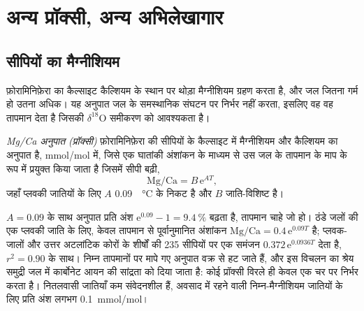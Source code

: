 \section{अन्य प्रॉक्सी, अन्य अभिलेखागार}\label{sec:b2:climate-proxies:others}

\subsection*{सीपियों का मैग्नीशियम}

फ़ोरामिनिफ़ेरा का कैल्साइट कैल्शियम के स्थान पर थोड़ा मैग्नीशियम ग्रहण करता है, और जल जितना गर्म हो
उतना अधिक। यह अनुपात जल के समस्थानिक संघटन पर निर्भर नहीं करता, इसलिए वह
वह तापमान देता है जिसकी $\delta^{18}$O समीकरण को आवश्यकता है।

\begin{definition}[Mg/Ca अनुपात (प्रॉक्सी)]\label{def:b2:climate-proxies:mgca}
\emph{Mg/Ca अनुपात (प्रॉक्सी)} फ़ोरामिनिफ़ेरा की सीपियों के कैल्साइट में
मैग्नीशियम और कैल्शियम का अनुपात है, \unit{mmol/mol} में, जिसे एक घातांकी अंशांकन
के माध्यम से उस जल के तापमान के माप के रूप में प्रयुक्त किया जाता है जिसमें सीपी बढ़ी,
\[
  \text{Mg/Ca} = B\,\mathrm{e}^{A T},
\]
जहाँ प्लवकी जातियों के लिए $A$ \qty{0.09}{\per\celsius} के निकट है और $B$ जाति-विशिष्ट है।
\end{definition}

$A = 0.09$ के साथ अनुपात प्रति अंश $\mathrm{e}^{0.09} - 1 = \qty{9.4}{\percent}$ बढ़ता है,
तापमान चाहे जो हो। ठंडे जलों की एक प्लवकी जाति के लिए, केवल तापमान से पूर्वानुमानित अंशांकन
$\text{Mg/Ca} = 0.4\,\mathrm{e}^{0.09T}$ है; प्लवक-जालों और उत्तर अटलांटिक कोरों के शीर्षों की 235 सीपियों पर
एक समंजन $0.372\,\mathrm{e}^{0.0936T}$ देता है, $r^2 = 0.90$ के साथ।
निम्न तापमानों पर मापे गए अनुपात वक्र से हट जाते हैं, और इस विचलन का श्रेय
समुद्री जल में कार्बोनेट आयन की सांद्रता को दिया जाता है: कोई प्रॉक्सी विरले ही केवल एक चर पर निर्भर करता है।
नितलवासी जातियाँ कम संवेदनशील हैं, अवसाद में रहने वाली निम्न-मैग्नीशियम जातियों के लिए
प्रति अंश लगभग \qty{0.1}{mmol/mol}।

